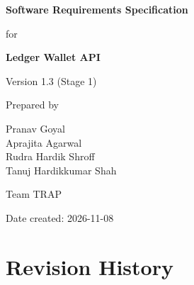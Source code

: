 \documentclass[11pt,a4paper]{article}
\begin{document}

\begin{titlepage}
  \centering
  \vspace*{3.5cm}
  {\Huge\bfseries Software Requirements Specification\par}
  \vspace{0.8cm}
  {\LARGE for\par}
  \vspace{0.8cm}
  {\Huge\bfseries Ledger Wallet API\par}
  \vspace{1.5cm}
  {\Large Version 1.3 (Stage 1)\par}
  \vspace{2.5cm}
  {\large Prepared by\par}
  \vspace{0.3cm}
  {\large Pranav Goyal\\ Aprajita Agarwal\\ Rudra Hardik Shroff\\ Tanuj Hardikkumar Shah\par}
  \vspace{1.2cm}
  {\large Team TRAP\par}
  \vspace{1.2cm}
  {\large Date created: 2026-11-08\par}
  \vfill
\end{titlepage}

\tableofcontents
\clearpage

\section{Revision History}\label{revision-history}
\end{document}
